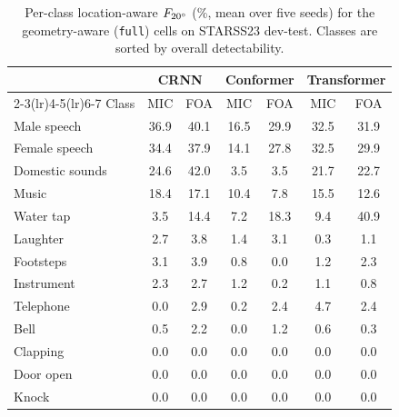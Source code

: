 \begin{table}[t]
\centering
\renewcommand{\arraystretch}{0.92}
\caption{Per-class location-aware $F_{20^\circ}$ (\%, mean over five seeds) for
the geometry-aware (\texttt{full}) cells on STARSS23 dev-test. Classes are sorted
by overall detectability.}
\label{tab:perclass}
\setlength{\tabcolsep}{5pt}
\begin{tabular}{lcccccc}
\toprule
 & \multicolumn{2}{c}{CRNN} & \multicolumn{2}{c}{Conformer} & \multicolumn{2}{c}{Transformer} \\
\cmidrule(lr){2-3}\cmidrule(lr){4-5}\cmidrule(lr){6-7}
Class & MIC & FOA & MIC & FOA & MIC & FOA \\
\midrule
Male speech    & 36.9 & 40.1 & 16.5 & 29.9 & 32.5 & 31.9 \\
Female speech  & 34.4 & 37.9 & 14.1 & 27.8 & 32.5 & 29.9 \\
Domestic sounds& 24.6 & 42.0 &  3.5 &  3.5 & 21.7 & 22.7 \\
Music          & 18.4 & 17.1 & 10.4 &  7.8 & 15.5 & 12.6 \\
Water tap      &  3.5 & 14.4 &  7.2 & 18.3 &  9.4 & 40.9 \\
Laughter       &  2.7 &  3.8 &  1.4 &  3.1 &  0.3 &  1.1 \\
Footsteps      &  3.1 &  3.9 &  0.8 &  0.0 &  1.2 &  2.3 \\
Instrument     &  2.3 &  2.7 &  1.2 &  0.2 &  1.1 &  0.8 \\
Telephone      &  0.0 &  2.9 &  0.2 &  2.4 &  4.7 &  2.4 \\
Bell           &  0.5 &  2.2 &  0.0 &  1.2 &  0.6 &  0.3 \\
Clapping       &  0.0 &  0.0 &  0.0 &  0.0 &  0.0 &  0.0 \\
Door open      &  0.0 &  0.0 &  0.0 &  0.0 &  0.0 &  0.0 \\
Knock          &  0.0 &  0.0 &  0.0 &  0.0 &  0.0 &  0.0 \\
\bottomrule
\end{tabular}
\end{table}
